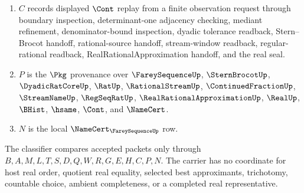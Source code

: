 \begin{definition}
\begin{enumerate}
\item $C$ records displayed $\Cont$ replay from a finite observation request through boundary inspection, determinant-one adjacency checking, mediant refinement, denominator-bound inspection, dyadic tolerance readback, Stern--Brocot handoff, rational-source handoff, stream-window readback, regular-rational readback, RealRationalApproximation handoff, and the real seal.
\item $P$ is the $\Pkg$ provenance over $\FareySequenceUp$, $\SternBrocotUp$, $\DyadicRatCoreUp$, $\RatUp$, $\RationalStreamUp$, $\ContinuedFractionUp$, $\StreamNameUp$, $\RegSeqRatUp$, $\RealRationalApproximationUp$, $\RealUp$, $\BHist$, $\hsame$, $\Cont$, and $\NameCert$.
\item $N$ is the local $\NameCert_{\FareySequenceUp}$ row.
\end{enumerate}
The classifier compares accepted packets only through $B,A,M,L,T,S,D,Q,W,R,G,E,H,C,P,N$. The carrier has no coordinate for host real order, quotient real equality, selected best approximants, trichotomy, countable choice, ambient completeness, or a completed real representative.
\end{definition}

